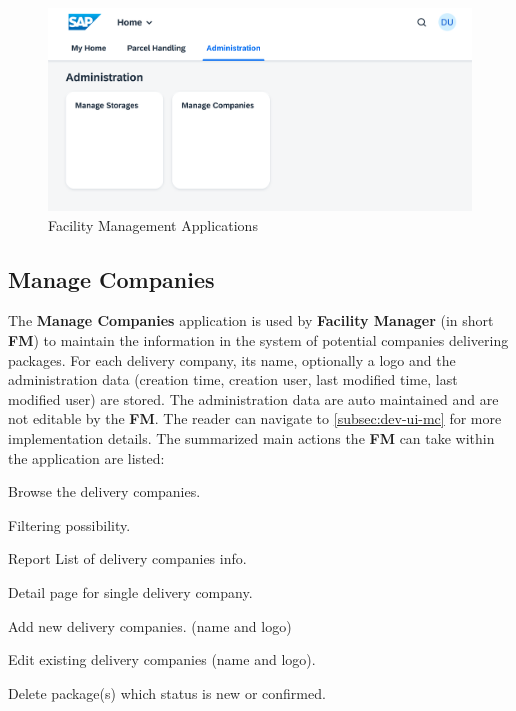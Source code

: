 \begin{figure}[H]
	\centering
	\includegraphics[width=1\linewidth]{images/user_doc/overviews/AdminTab.png}
	\caption{Facility Management Applications}
	\label{fig:ManagerApplications}
\end{figure}


\subsection{Manage Companies}
\label{subsec:mc}

The \textbf{Manage Companies} application is used by \textbf{Facility Manager} (in short \textbf{FM}) to maintain the information in the system of potential companies delivering packages. For each delivery company, its name, optionally a logo and the administration data (creation time, creation user, last modified time, last modified user) are stored. The administration data are auto maintained and are not editable by the \textbf{FM}. The reader can navigate to \autoref{subsec:dev-ui-mc} for more implementation details. The summarized main actions the \textbf{FM} can take within the application are listed:

\begin{compactenum}
	\item Browse the delivery companies.
        \begin{compactenum}
            \item Filtering possibility.
            \item Report List of delivery companies info.
            \item Detail page for single delivery company.
        \end{compactenum}
    \item Add new delivery companies. (name and logo)
    \item Edit existing delivery companies (name and logo).
    \item Delete package(s) which status is new or confirmed.
\end{compactenum}

